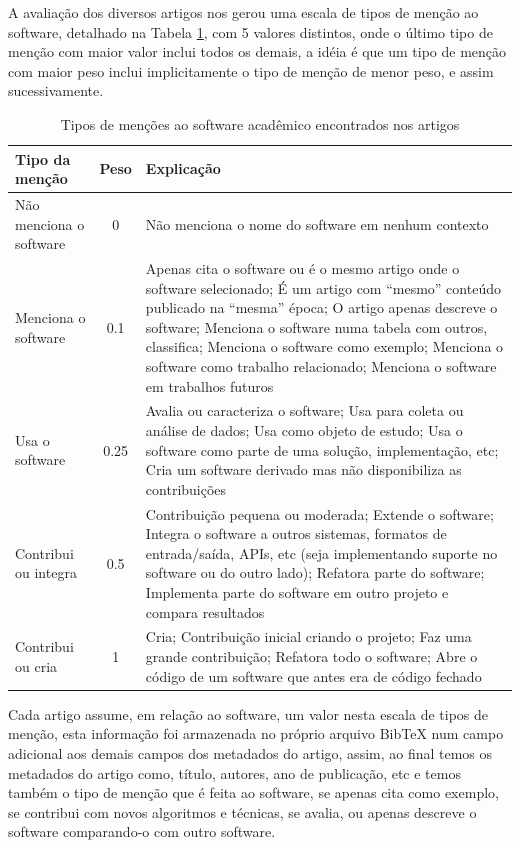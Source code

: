 A avaliação dos diversos artigos nos gerou uma escala de tipos de menção ao
software, detalhado na Tabela \ref{coding-scheme-mention}, com 5 valores
distintos, onde o último tipo de menção com maior valor inclui todos os demais,
a idéia é que um tipo de menção com maior peso inclui implicitamente o tipo de
menção de menor peso, e assim sucessivamente.

\begin{table}[h]
\caption{Tipos de menções ao software acadêmico encontrados nos artigos}
\centering
\begin{tabular}{ l c p{10cm} }
  \hline
  Tipo da menção   & Peso & Explicação \\
  \hline
  Não menciona o software  & 0  & Não menciona o nome do software em nenhum contexto \\
  Menciona o software  & 0.1    & Apenas cita o software ou é o mesmo artigo onde o software selecionado; É um artigo com ``mesmo'' conteúdo publicado na ``mesma'' época; O artigo apenas descreve o software; Menciona o software numa tabela com outros, classifica; Menciona o software como exemplo; Menciona o software como trabalho relacionado; Menciona o software em trabalhos futuros \\
  Usa o software   & 0.25    & Avalia ou caracteriza o software; Usa para coleta ou análise de dados; Usa como objeto de estudo; Usa o software como parte de uma solução, implementação, etc; Cria um software derivado mas não disponibiliza as contribuições \\
  Contribui ou integra & 0.5 & Contribuição pequena ou moderada; Extende o software; Integra o software a outros sistemas, formatos de entrada/saída, APIs, etc (seja implementando suporte no software ou do outro lado); Refatora parte do software; Implementa parte do software em outro projeto e compara resultados \\
  Contribui ou cria & 1 & Cria; Contribuição inicial criando o projeto; Faz uma grande contribuição; Refatora todo o software; Abre o código de um software que antes era de código fechado \\
  \hline
\end{tabular}
\label{coding-scheme-mention}
\end{table}

Cada artigo assume, em relação ao software, um valor nesta escala de tipos de
menção, esta informação foi armazenada no próprio arquivo BibTeX num campo
adicional aos demais campos dos metadados do artigo, assim, ao final temos os
metadados do artigo como, título, autores, ano de publicação, etc e temos
também o tipo de menção que é feita ao software, se apenas cita como exemplo,
se contribui com novos algoritmos e técnicas, se avalia, ou apenas descreve o
software comparando-o com outro software.


